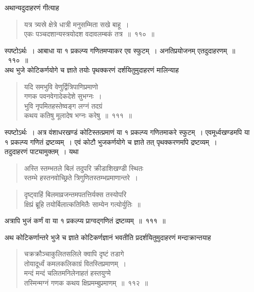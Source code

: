 \documentclass[11pt, openany]{book}
\begin{document}
\vspace{-2mm}
 अथान्यदुदाहरणं गीत्याह\textendash
\begin{quote}
    \eg 
    यत्र त्र्यस्रे क्षेत्रे धात्री मनुसम्मिता सखे बाहू~। \\
 एकः पञ्चदशान्यस्त्रयोदश वदावलम्बकं तत्र~॥~११०~॥
\end{quote}

 स्पष्टोऽर्थः~। आबाधा या १ प्रकल्प्य गणितमप्याकर एव स्फुटम्~।
अनतिप्रयोजनम् एतदुदाहरणम्~॥~११०~॥\\

\vspace{-2mm}
 अथ भुजे कोटिकर्णयोगे च ज्ञाते तयोः पृथक्करणं दर्शयितुमुदाहरणं
मालिन्याह\textendash
\begin{quote}
    \eg
     यदि समभुवि वेणुर्द्वित्रिपाणिप्रमाणो \\
 गणक पवनवेगादेकदेशे सुभग्नः~। \\
 भुवि नृपमितहस्तेष्वङ्ग लग्नं तदग्रं \\
 कथय कतिषु मूलादेष भग्नः करेषु~॥~१११~॥~
\end{quote}

 स्पष्टोऽर्थः~। अत्र वंशाधरखण्डं कोटिस्तत्प्रमाणं या १ प्रकल्प्य
गणितमाकरे 
स्फुटम्~। एवमूर्ध्वखण्डमपि या १ प्रकल्प्य गणितं द्रष्टव्यम्~। एवं कोटौ
भुजकर्णयोगे च ज्ञाते तत् पृथक्करणमपि द्रष्टव्यम्~। \\

\vspace{-2mm}
 तदुदाहरणं पाट्यामुक्तम्~। यथा\textendash
\begin{quote}
    {\qt अस्ति स्तम्भतले बिलं तदुपरि क्रीडाशिखण्डी स्थितः \\
 स्तम्भे हस्तनवोच्छ्रिते त्रिगुणितस्तम्भप्रमाणान्तरे~।}
\end{quote}
\newpage 
\begin{quote}
     {\qt दृष्ट्वाहिं बिलमाव्रजन्तमपतत्तिर्यक्स तस्योपरि \\
 क्षिप्रं ब्रूहि तयोर्बिलात्कतिमितैः साम्येन गत्योर्युतिः~॥~}
 
\end{quote}

 अत्रापि भुजं कर्णं वा या १ प्रकल्प्य प्राग्वद्गणितं द्रष्टव्यम्~॥~१११~॥\\
 \vspace{-2mm}
 
 अथ कोटिकर्णान्तरे भुजे च ज्ञाते कोटिकर्णज्ञानं भवतीति
प्रदर्शयितुमुदाहरणं मन्दाक्रान्तयाह\textendash
\begin{quote}
    \eg 
     चक्रक्रौञ्चाकुलितसलिले क्वापि दृष्टं तडागे \\
 तोयादूर्ध्वं कमलकलिकाग्रं वितस्तिप्रमाणम्~। \\
 मन्दं मन्दं चलितमनिलेनाहतं हस्तयुग्मे \\
 तस्मिन्मग्नं गणक कथय क्षिप्रमम्बुप्रमाणम्~॥~११२~॥
\end{quote}
\end{document}
